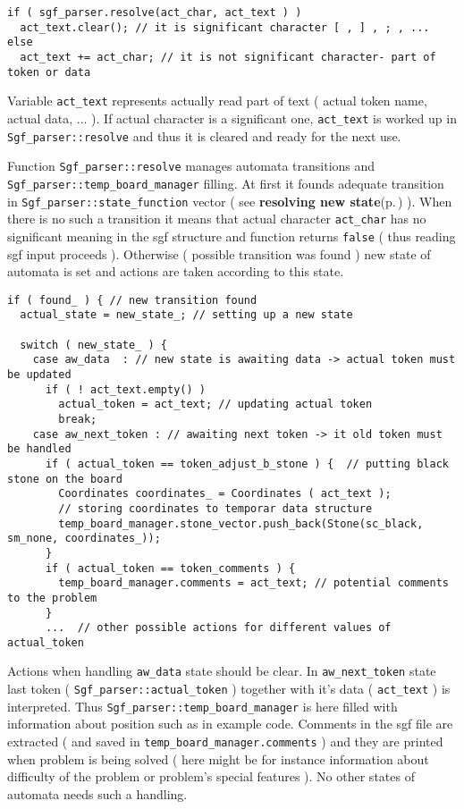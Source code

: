 \footnotesize\begin{verbatim}if ( sgf_parser.resolve(act_char, act_text ) ) 
  act_text.clear(); // it is significant character [ , ] , ; , ... 
else              
  act_text += act_char; // it is not significant character- part of token or data 
\end{verbatim}
\normalsize


Variable {\tt act\_\-text} represents actually read part of text ( actual token name, actual data, ... ). If actual character is a significant one, {\tt act\_\-text} is worked up in {\tt Sgf\_\-parser::resolve} and thus it is cleared and ready for the next use.

Function {\tt Sgf\_\-parser::resolve} manages automata transitions and {\tt Sgf\_\-parser::temp\_\-board\_\-manager} filling. At first it founds adequate transition in {\tt Sgf\_\-parser::state\_\-function} vector ( see {\bf resolving new state}{\rm (p.\,\pageref{page_5_page_5__resolving_new_state})} ). When there is no such a transition it means that actual character {\tt act\_\-char} has no significant meaning in the sgf structure and function returns {\tt false} ( thus reading sgf input proceeds ). Otherwise ( possible transition was found ) new state of automata is set and actions are taken according to this state.



\footnotesize\begin{verbatim}if ( found_ ) { // new transition found
  actual_state = new_state_; // setting up a new state 

  switch ( new_state_ ) {
    case aw_data  : // new state is awaiting data -> actual token must be updated
      if ( ! act_text.empty() ) 
        actual_token = act_text; // updating actual token
        break;
    case aw_next_token : // awaiting next token -> it old token must be handled
      if ( actual_token == token_adjust_b_stone ) {  // putting black stone on the board
        Coordinates coordinates_ = Coordinates ( act_text ); 
        // storing coordinates to temporar data structure
        temp_board_manager.stone_vector.push_back(Stone(sc_black, sm_none, coordinates_));
      } 
      if ( actual_token == token_comments ) {
        temp_board_manager.comments = act_text; // potential comments to the problem
      }
      ...  // other possible actions for different values of actual_token 
\end{verbatim}
\normalsize


Actions when handling {\tt aw\_\-data} state should be clear. In {\tt aw\_\-next\_\-token} state last token ( {\tt Sgf\_\-parser::actual\_\-token} ) together with it's data ( {\tt act\_\-text} ) is interpreted. Thus {\tt Sgf\_\-parser::temp\_\-board\_\-manager} is here filled with information about position such as in example code. Comments in the sgf file are extracted ( and saved in {\tt temp\_\-board\_\-manager.comments} ) and they are printed when problem is being solved ( here might be for instance information about difficulty of the problem or problem's special features ). No other states of automata needs such a handling. 